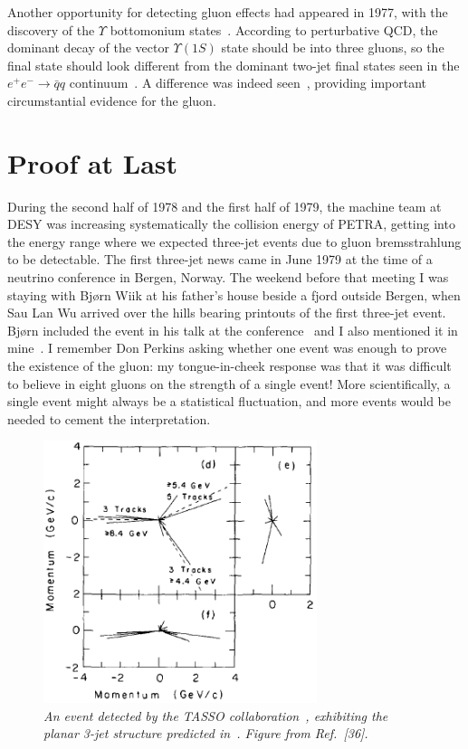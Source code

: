 \documentclass{ws-rv975x65}[12pt]
\begin{document}
Another opportunity for detecting gluon effects had appeared in 1977, with the discovery of the $\Upsilon$
bottomonium states~\cite{Ups}. According to perturbative QCD, the dominant decay of the vector $\Upsilon(1S)$ state
should be into three gluons, so the final state should look different from the dominant two-jet final states
seen in the $e^+ e^- \to {\bar q}q$ continuum~\cite{Ups3}. A difference was indeed seen~\cite{PLUTO}, providing important
circumstantial evidence for the gluon.

\section{Proof at Last}

During the second half of 1978 and the first half of 1979, the machine team at DESY was
increasing systematically the collision energy of PETRA, getting into the energy range where
we expected three-jet events due to gluon bremsstrahlung to be detectable.
The first three-jet news came in June 1979 at the time of a neutrino conference in Bergen, Norway. 
The weekend before that meeting I was staying with Bj{\o}rn Wiik at his father's house beside a fjord
outside Bergen, when Sau Lan Wu arrived over the hills bearing printouts of the first three-jet event. 
Bj{\o}rn included the event in his talk at the conference~\cite{BW} and I also mentioned it in mine~\cite{JEB}. 
I remember Don Perkins asking whether one event was enough to prove the existence of the gluon:
my tongue-in-cheek response was that it was difficult to believe in eight gluons on the strength of a single event!
More scientifically, a single event might always be a statistical fluctuation, and more events would
be needed to cement the interpretation.

\begin{figure}[htb]
\centerline{\includegraphics[width=8cm]{3jet.png}}
\caption{\it An event detected by the TASSO collaboration~\protect\cite{BW,TASSO},
exhibiting the planar 3-jet structure predicted in~\protect\cite{EGR}. Figure from Ref.~[36].} \label{3jet}
\end{figure}
\end{document}
